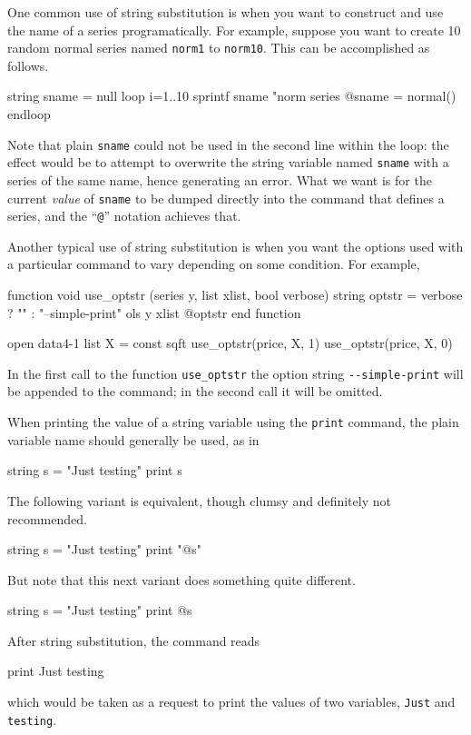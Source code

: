 One common use of string substitution is when you want to construct
and use the name of a series programatically. For example, suppose you
want to create 10 random normal series named \texttt{norm1} to
\texttt{norm10}. This can be accomplished as follows.
%
\begin{code}
string sname = null
loop i=1..10
  sprintf sname "norm%
  series @sname = normal()
endloop
\end{code}
%
Note that plain \texttt{sname} could not be used in the second line
within the loop: the effect would be to attempt to overwrite the
string variable named \texttt{sname} with a series of the same name,
hence generating an error. What we want is for the current
\textit{value} of \texttt{sname} to be dumped directly into the
command that defines a series, and the ``\verb|@|'' notation achieves
that.

Another typical use of string substitution is when you want the
options used with a particular command to vary depending on
some condition. For example,
%
\begin{code}
function void use_optstr (series y, list xlist, bool verbose)
   string optstr = verbose ? "" : "--simple-print"
   ols y xlist @optstr 
end function

open data4-1
list X = const sqft
use_optstr(price, X, 1)
use_optstr(price, X, 0)
\end{code}

In the first call to the function \texttt{use\_optstr} the option
string \verb|--simple-print| will be appended to the 
command; in the second call it will be omitted.

When printing the value of a string variable using the \texttt{print}
command, the plain variable name should generally be used, as in
%
\begin{code}
string s = "Just testing"
print s
\end{code}
%
The following variant is equivalent, though clumsy and definitely not
recommended.
%
\begin{code}
string s = "Just testing"
print "@s"
\end{code}
%
But note that this next variant does something quite different.
%
\begin{code}
string s = "Just testing"
print @s
\end{code}
%
After string substitution, the command reads
%
\begin{code}
print Just testing
\end{code}
%
which would be taken as a request to print the values of two
variables, \texttt{Just} and \texttt{testing}.

